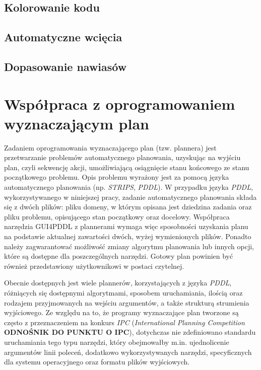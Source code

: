 \subsection{Kolorowanie kodu}
\subsection{Automatyczne wcięcia}
\subsection{Dopasowanie nawiasów}
\section{Współpraca z oprogramowaniem wyznaczającym plan}
\label{sec:wspolpraca}
Zadaniem oprogramowania wyznaczającego plan (tzw. plannera) jest przetwarzanie problemów automatycznego planowania, uzyskując na wyjściu plan, czyli sekwencję akcji, umożliwiającą osiągnięcie stanu końcowego ze stanu początkowego problemu. Opis problemu wyrażony jest za pomocą języka automatycznego planowania (np. \textit{STRIPS}, \textit{PDDL}). W przypadku języka \textit{PDDL}, wykorzystywanego w niniejszej pracy, zadanie automatycznego planowania składa się z dwóch plików: pliku domeny, w którym opisana jest dziedzina zadania oraz pliku problemu, opisującego stan początkowy oraz docelowy. Współpraca narzędzia GUI4PDDL z plannerami wymaga więc sposobności uzyskania planu na podstawie aktualnej zawartości dwóch, wyżej wymienionych plików. Ponadto należy zagwarantować możliwość zmiany algorytmu planowania lub innych opcji, które są dostępne dla poszczególnych narzędzi. Gotowy plan powinien być również przedstawiony użytkownikowi w postaci czytelnej.

Obecnie dostępnych jest wiele plannerów, korzystających z języka \textit{PDDL}, różniących się dostępnymi algorytmami, sposobem uruchamiania, ilością oraz rodzajem przyjmowanych na wejściu argumentów, a także strukturą strumienia wyjściowego. Ze względu na to, że programy wyznaczające plan tworzone są często z przeznaczeniem na konkurs \textit{IPC} (\textit{International Planning Competition} \textbf{ODNOŚNIK DO PUNKTU O IPC}), dotychczas nie zdefiniowano standardu uruchamiania tego typu narzędzi, który obejmowałby m.in. ujednolicenie argumentów linii poleceń, dodatkowo wykorzystywanych narzędzi, specyficznych dla systemu operacyjnego oraz formatu plików wyjściowych.

